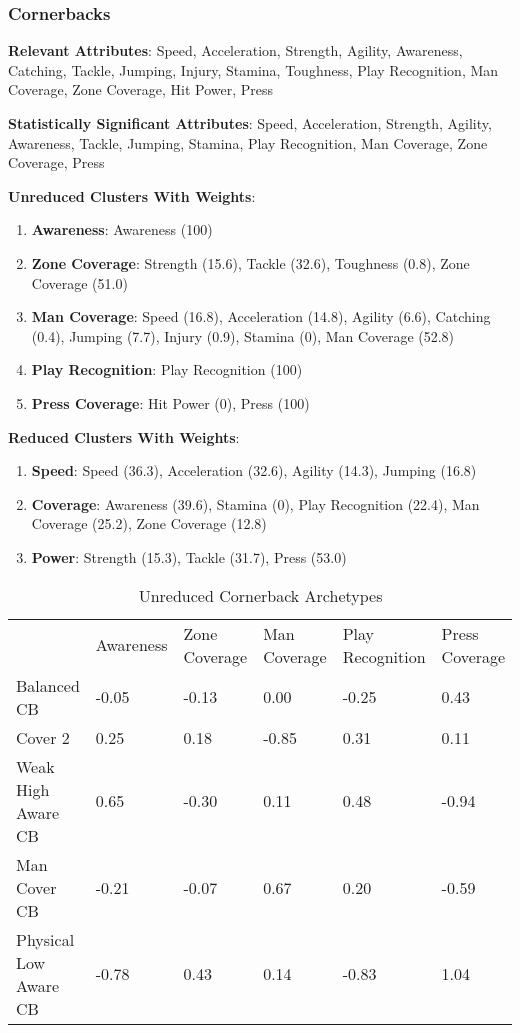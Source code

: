 \documentclass[11pt]{article}
\begin{document}
\subsubsection{Cornerbacks}

\textbf{Relevant Attributes}: Speed, Acceleration, Strength, Agility, Awareness, Catching, Tackle, Jumping, Injury, Stamina, Toughness, Play Recognition, Man Coverage, Zone Coverage, Hit Power, Press

\textbf{Statistically Significant Attributes}: Speed, Acceleration, Strength, Agility, Awareness, Tackle, Jumping, Stamina, Play Recognition, Man Coverage, Zone Coverage, Press

\textbf{Unreduced Clusters With Weights}:

\begin{enumerate}
\item{\textbf{Awareness}}: Awareness (100)
\item{\textbf{Zone Coverage}}: Strength (15.6), Tackle (32.6), Toughness (0.8), Zone Coverage (51.0)
\item{\textbf{Man Coverage}}: Speed (16.8), Acceleration (14.8), Agility (6.6), Catching (0.4), Jumping (7.7), Injury (0.9), Stamina (0), Man Coverage (52.8)
\item{\textbf{Play Recognition}}: Play Recognition (100)
\item{\textbf{Press Coverage}}: Hit Power (0), Press (100)
\end{enumerate}

\textbf{Reduced Clusters With Weights}:

\begin{enumerate}
\item{\textbf{Speed}}: Speed (36.3), Acceleration (32.6), Agility (14.3), Jumping (16.8)
\item{\textbf{Coverage}}: Awareness (39.6), Stamina (0), Play Recognition (22.4), Man Coverage (25.2), Zone Coverage (12.8)
\item{\textbf{Power}}: Strength (15.3), Tackle (31.7), Press (53.0)
\end{enumerate}

\begin{table}[]
\centering
\caption{Unreduced Cornerback Archetypes}
\label{UnreducedCornerback}
\begin{tabular}{llllll}
                      & Awareness & Zone Coverage & Man Coverage & Play Recognition & Press Coverage \\
Balanced CB           & -0.05     & -0.13         & 0.00         & -0.25            & 0.43           \\
Cover 2               & 0.25      & 0.18          & -0.85        & 0.31             & 0.11           \\
Weak High Aware CB    & 0.65      & -0.30         & 0.11         & 0.48             & -0.94          \\
Man Cover CB          & -0.21     & -0.07         & 0.67         & 0.20             & -0.59          \\
Physical Low Aware CB & -0.78     & 0.43          & 0.14         & -0.83            & 1.04          
\end{tabular}
\end{table}
\end{document}
